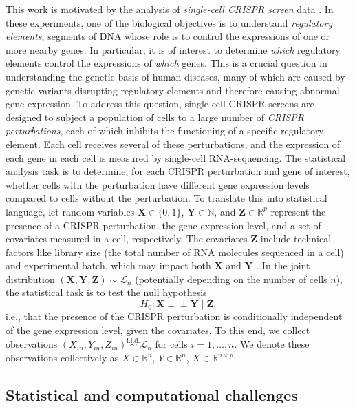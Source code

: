 \documentclass[12pt]{article}
\theoremstyle{definition}
\newcommand{\indep}{\perp \!\!\! \perp}
\newcommand{\R}{\mathbb{R}}								%
\newcommand{\N}{\mathbb{N}}								%
\newcommand{\iidsim}{\stackrel{\mathrm{i.i.d.}}{\sim}} 	%
\newcommand{\prx}{\bm X}								%
\newcommand{\srx}{X}									%
\newcommand{\prz}{\bm Z}								%
\newcommand{\srz}{Z}									%
\newcommand{\pry}{{\bm Y}}								%
\newcommand{\sry}{Y}									%
\newcommand{\law}{\mathcal L}							%
\begin{document}
This work is motivated by the analysis of \textit{single-cell CRISPR screen} data \citep{Dixit2016,Adamson2016,Jaitin2016,Datlinger2017}. In these experiments, one of the biological objectives is to understand \textit{regulatory elements}, segments of DNA whose role is to control the expressions of one or more nearby genes. In particular, it is of interest to determine \textit{which} regulatory elements control the expressions of \textit{which} genes. This is a crucial question in understanding the genetic basis of human diseases, many of which are caused by genetic variants disrupting regulatory elements and therefore causing abnormal gene expression. To address this question, single-cell CRISPR screens are designed to subject a population of cells to a large number of \textit{CRISPR perturbations}, each of which inhibits the functioning of a specific regulatory element. Each cell receives several of these perturbations, and the expression of each gene in each cell is measured by single-cell RNA-sequencing. The statistical analysis task is to determine, for each CRISPR perturbation and gene of interest, whether cells with the perturbation have different gene expression levels compared to cells without the perturbation. To translate this into statistical language, let random variables $\prx \in \{0,1\}$, $\pry \in \N$, and $\prz \in \R^p$ represent the presence of a CRISPR perturbation, the gene expression level, and a set of covariates measured in a cell, respectively. The covariates $\prz$ include technical factors like library size (the total number of RNA molecules sequenced in a cell) and experimental batch, which may impact both $\prx$ and $\pry$ \citep{Katsevich2020c}. In the joint distribution $(\prx, \pry, \prz) \sim \law_n$ (potentially depending on the number of cells $n$), the statistical task is to test the null hypothesis 
\begin{equation}
H_0: \prx \indep \pry \mid \prz, 
\end{equation}
i.e., that the presence of the CRISPR perturbation is conditionally independent of the gene expression level, given the covariates. To this end, we collect observations $(\srx_{in}, \sry_{in}, \srz_{in}) \iidsim \law_n$ for cells $i = 1, \dots, n$. We denote these observations collectively as $\srx \in \R^n$, $\sry \in \R^n$, $\srx \in \R^{n \times p}$.

\subsection{Statistical and computational challenges} \label{sec:statistical-computational-challenges}
\end{document}
